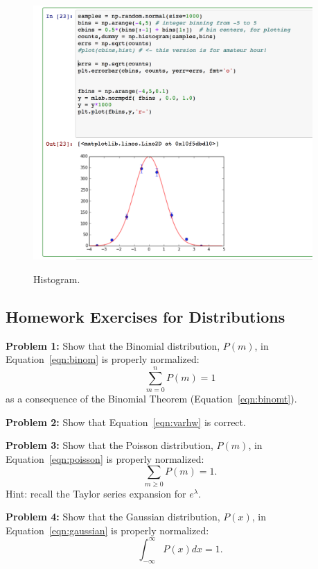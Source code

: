 \documentclass[12pt]{article}
\begin{document}
\begin{figure}[htbp]
\begin{center}
{\includegraphics[width=0.95\textwidth]{figs/scipy_hist.png}}
\end{center}
\caption{\label{fig:sphist} Histogram.}
\end{figure}

\newpage
\subsection{Homework Exercises for Distributions}

\noindent
{\bf Problem 1:} Show that the Binomial distribution, $P(m)$, in Equation~\ref{eqn:binom} is properly normalized:
\begin{displaymath}
\sum_{m=0}^n P(m) = 1
\end{displaymath}
as a consequence of the Binomial Theorem (Equation~\ref{eqn:binomt}).

\vskip 1cm
\noindent
{\bf Problem 2:} Show that Equation~\ref{eqn:varhw} is correct.

\vskip 1cm
\noindent
{\bf Problem 3:} Show that the Poisson distribution, $P(m)$, in Equation~\ref{eqn:poisson} is properly normalized:
\begin{displaymath}
\sum_{m \geq 0} P(m) = 1.
\end{displaymath}
Hint: recall the Taylor series expansion for $e^\lambda$.

\vskip 1cm
\noindent
{\bf Problem 4:} Show that the Gaussian distribution, $P(x)$, in Equation~\ref{eqn:gaussian} is properly normalized:
\begin{displaymath}
\int_{-\infty}^{\infty} P(x) dx = 1.
\end{displaymath}
\end{document}
